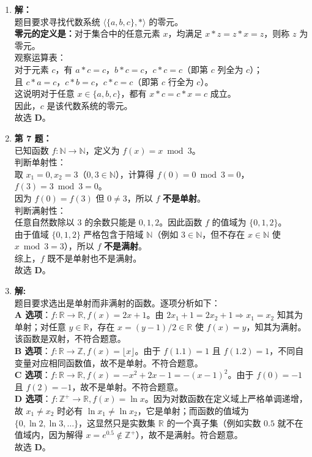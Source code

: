 \begin{enumerate}
	\item \textbf{解：}\\
	题目要求寻找代数系统 $\langle \{a, b, c\}, * \rangle$ 的零元。\\
	\textbf{零元的定义是：}对于集合中的任意元素 $x$，均满足 $x * z = z * x = z$，则称 $z$ 为零元。\\
	观察运算表：\\
	对于元素 $c$，有 $a * c = c$，$b * c = c$，$c * c = c$（即第 $c$ 列全为 $c$）；\\
	且 $c * a = c$，$c * b = c$，$c * c = c$（即第 $c$ 行全为 $c$）。\\
	这说明对于任意 $x \in \{a, b, c\}$，都有 $x * c = c * x = c$ 成立。\\
	因此，$c$ 是该代数系统的零元。\\
	故选 \textbf{D}。
	
	\item \textbf{第 7 题：}\\
	已知函数 $f: \mathbb{N} \to \mathbb{N}$，定义为 $f(x) = x \bmod 3$。\\
	判断单射性：\\
	取 $x_1 = 0, x_2 = 3$（$0, 3 \in \mathbb{N}$），计算得 $f(0) = 0 \bmod 3 = 0$，$f(3) = 3 \bmod 3 = 0$。\\
	因为 $f(0) = f(3)$ 但 $0 \neq 3$，所以 $f$ \textbf{不是单射}。\\
	判断满射性：\\
	任意自然数除以 $3$ 的余数只能是 $0, 1, 2$。因此函数 $f$ 的值域为 $\{0, 1, 2\}$。\\
	由于值域 $\{0, 1, 2\}$ 严格包含于陪域 $\mathbb{N}$（例如 $3 \in \mathbb{N}$，但不存在 $x \in \mathbb{N}$ 使 $x \bmod 3 = 3$），所以 $f$ \textbf{不是满射}。\\
	综上，$f$ 既不是单射也不是满射。\\
	故选 \textbf{D}。
	
	\item \textbf{解:}\\
	题目要求选出是单射而非满射的函数。逐项分析如下：\\
	\textbf{A 选项}：$f: \mathbb{R} \to \mathbb{R}, f(x) = 2x + 1$。由 $2x_1+1 = 2x_2+1 \Rightarrow x_1=x_2$ 知其为单射；对任意 $y \in \mathbb{R}$，存在 $x = (y-1)/2 \in \mathbb{R}$ 使 $f(x)=y$，知其为满射。该函数是双射，不符合题意。\\
	\textbf{B 选项}：$f: \mathbb{R} \to \mathbb{Z}, f(x) = \lfloor x \rfloor$。由于 $f(1.1) = 1$ 且 $f(1.2) = 1$，不同自变量对应相同函数值，故不是单射。不符合题意。\\
	\textbf{C 选项}：$f: \mathbb{R} \to \mathbb{R}, f(x) = -x^2 + 2x - 1 = -(x-1)^2$。由于 $f(0) = -1$ 且 $f(2) = -1$，故不是单射。不符合题意。\\
	\textbf{D 选项}：$f: \mathbb{Z}^+ \to \mathbb{R}, f(x) = \ln x$。因为对数函数在定义域上严格单调递增，故 $x_1 \neq x_2$ 时必有 $\ln x_1 \neq \ln x_2$，它是单射；而函数的值域为 $\{0, \ln 2, \ln 3, \dots\}$，这显然只是实数集 $\mathbb{R}$ 的一个真子集（例如实数 $0.5$ 就不在值域内，因为解得 $x = e^{0.5} \notin \mathbb{Z}^+$），故不是满射。符合题意。\\
	故选 \textbf{D}。
\end{enumerate}

